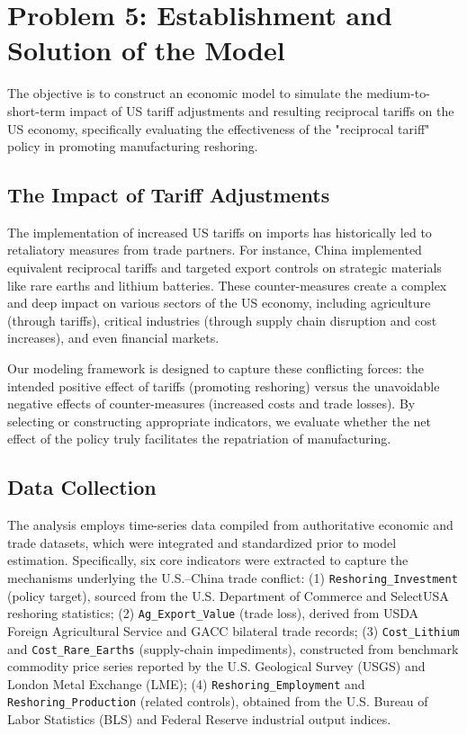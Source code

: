 \documentclass{apmcmthesis}
\begin{document}
\section{Problem 5: Establishment and Solution of the Model}

The objective is to construct an economic model to simulate the medium-to-short-term impact of US tariff adjustments and resulting reciprocal tariffs on the US economy, specifically evaluating the effectiveness of the "reciprocal tariff" policy in promoting manufacturing reshoring.

\subsection{The Impact of Tariff Adjustments}
The implementation of increased US tariffs on imports has historically led to retaliatory measures from trade partners. For instance, China implemented equivalent reciprocal tariffs and targeted export controls on strategic materials like rare earths and lithium batteries. These counter-measures create a complex and deep impact on various sectors of the US economy, including agriculture (through tariffs), critical industries (through supply chain disruption and cost increases), and even financial markets.

Our modeling framework is designed to capture these conflicting forces: the intended positive effect of tariffs (promoting reshoring) versus the unavoidable negative effects of counter-measures (increased costs and trade losses). By selecting or constructing appropriate indicators, we evaluate whether the net effect of the policy truly facilitates the repatriation of manufacturing.

\subsection{Data Collection}

The analysis employs time-series data compiled from authoritative economic and trade datasets, which were integrated and standardized prior to model estimation. Specifically, six core indicators were extracted to capture the mechanisms underlying the U.S.–China trade conflict:
(1) \texttt{Reshoring\_Investment} (policy target), sourced from the U.S. Department of Commerce and SelectUSA reshoring statistics;
(2) \texttt{Ag\_Export\_Value} (trade loss), derived from USDA Foreign Agricultural Service and GACC bilateral trade records;
(3) \texttt{Cost\_Lithium} and \texttt{Cost\_Rare\_Earths} (supply-chain impediments), constructed from benchmark commodity price series reported by the U.S. Geological Survey (USGS) and London Metal Exchange (LME);
(4) \texttt{Reshoring\_Employment} and \texttt{Reshoring\_Production} (related controls), obtained from the U.S. Bureau of Labor Statistics (BLS) and Federal Reserve industrial output indices.
\end{document}
